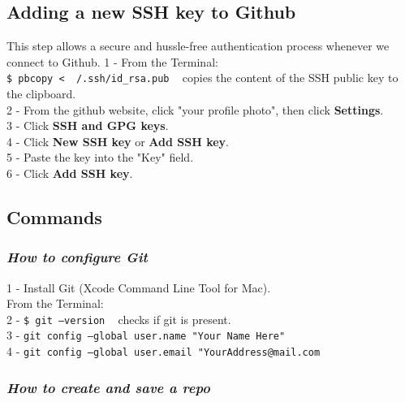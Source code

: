 \documentclass{article}
\begin{document}
{{{\subsection{Adding a new SSH key to Github}
This step allows a secure and hussle-free authentication process whenever we connect to Github. 
1 - From the Terminal:\\
\texttt{\$ pbcopy < ~/.ssh/id\_rsa.pub} ~ copies the content of the SSH public key to the clipboard. \\
2 - From the github website, click "your profile photo", then click \textbf{Settings}.\\
3 - Click \textbf{SSH and GPG keys}.\\
4 - Click \textbf{New SSH key} or \textbf{Add SSH key}.\\
5 - Paste the key into the "Key" field.\\
6 - Click \textbf{Add SSH key}.\\

\subsection{Commands}
\subsubsection{\small\textsl{How to configure Git}}

1 - Install Git (Xcode Command Line Tool for Mac). \\
From the Terminal:\\
2 - \texttt{\$ git --version} ~ checks if git is present.\\
3 - \texttt{git config --global user.name "Your Name Here"} \\
4 - \texttt{git config --global user.email "YourAddress@mail.com}\\

\subsubsection{\small\textsl{How to create and save a repo}}

}}}
\end{document}
